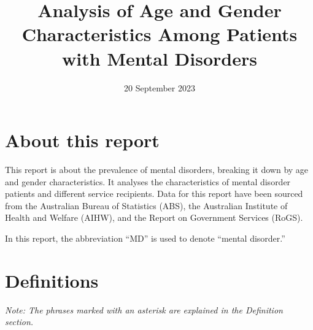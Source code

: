 \documentclass[
  a4paper,
  DIV=11,
  numbers=noendperiod]{scrreport}
\title{Analysis of Age and Gender Characteristics Among Patients with
Mental Disorders}
\author{}
\date{20 September 2023}
\renewcommand*\contentsname{Table of contents}
\newcommand\contentsname{Table of contents}
\begin{document}
\maketitle
\ifdefined\Shaded\renewenvironment{Shaded}{\begin{tcolorbox}[frame hidden, breakable, borderline west={3pt}{0pt}{shadecolor}, enhanced, interior hidden, boxrule=0pt, sharp corners]}{\end{tcolorbox}}\fi

\renewcommand*\contentsname{Table of contents}
{
\setcounter{tocdepth}{2}
\tableofcontents
}

\hypertarget{about-this-report}{%
\chapter{About this report}\label{about-this-report}}

This report is about the prevalence of mental disorders, breaking it
down by age and gender characteristics. It analyses the characteristics
of mental disorder patients and different service recipients. Data for
this report have been sourced from the Australian Bureau of Statistics
(ABS), the Australian Institute of Health and Welfare (AIHW), and the
Report on Government Services (RoGS).

In this report, the abbreviation ``MD'' is used to denote ``mental
disorder.''


\hypertarget{definitions}{%
\chapter{Definitions}\label{definitions}}

\emph{Note: The phrases marked with an asterisk are explained in the
Definition section.}
\end{document}
